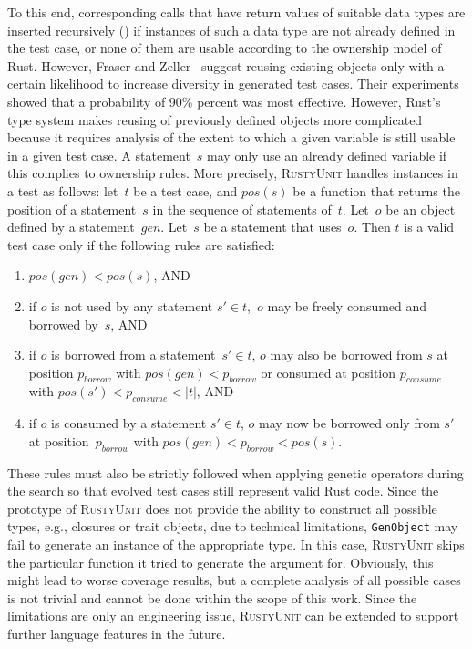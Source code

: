 \documentclass[paper=a4,%
  twoside,%
  BCOR4mm,%
  abstract=true,%
  toc=bibliography,%
  chapterprefix=true,%
  toc=bibliographynumbered,%
  open=right,%
  english,%
  pagesize=pdftex]{scrreprt}
\newcommand{\tech}{\textsc{RustyUnit}\xspace}
\begin{document}
To this end, corresponding calls that have return values of suitable data types are inserted recursively () if instances of such a data type are not already defined in the test case, or none of them are usable according to the ownership model of Rust. However, Fraser and Zeller~\cite{Fraser2012} suggest reusing existing objects only with a certain likelihood to increase diversity in generated test cases. Their experiments showed that a probability of 90\% percent was most effective. However, Rust's type system makes reusing of previously defined objects more complicated because it requires analysis of the extent to which a given variable is still usable in a given test case. A statement~$s$ may only use an already defined variable if this complies to ownership rules. More precisely, \tech handles instances in a test as follows: let~$t$ be a test case, and $pos(s)$ be a function that returns the position of a statement~$s$ in the sequence of statements of~$t$. Let~$o$ be an object defined by a statement~$gen$. Let~$s$ be a statement that uses~$o$. Then $t$ is a valid test case only if the following rules are satisfied:
\begin{enumerate}
    \item $pos(gen) < pos(s)$, AND
    \item if $o$ is not used by any statement $s' \in t$,~$o$ may be freely consumed and borrowed by~$s$, AND
    \item if $o$ is borrowed from a statement~$s' \in t$, $o$ may also be borrowed from $s$ at position $p_{borrow}$ with $pos(gen) < p_{borrow}$ or consumed at position $p_{consume}$ with $pos(s') < p_{consume} < \left|t\right|$, AND
    \item if $o$ is consumed by a statement $s' \in t$, $o$ may now be borrowed only from $s'$ at position~$p_{borrow}$ with $pos(gen) < p_{borrow} < pos(s)$.
\end{enumerate}

These rules must also be strictly followed when applying genetic operators during the search so that evolved test cases still represent valid Rust code. Since the prototype of \tech does not provide the ability to construct all possible types, e.g., closures or trait objects, due to technical limitations, \texttt{GenObject} may fail to generate an instance of the appropriate type. In this case, \tech skips the particular function it tried to generate the argument for. Obviously, this might lead to worse coverage results, but a complete analysis of all possible cases is not trivial and cannot be done within the scope of this work. Since the limitations are only an engineering issue, \tech can be extended to support further language features in the future.
\end{document}
